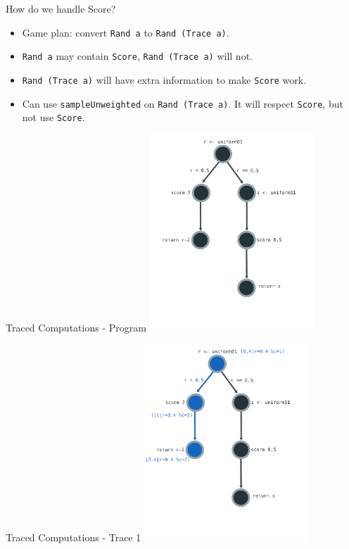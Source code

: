 \documentclass{beamer}
\newcommand{\hsmint}[1]{\texttt{#1}}
\begin{document}
\begin{frame}[fragile]{How do we handle Score?}
    \begin{itemize}
        \item Game plan: convert \hsmint{Rand a} to \hsmint{Rand (Trace a)}.
        \item \hsmint{Rand a} may contain \hsmint{Score}, \hsmint{Rand (Trace a)} will not.
        \item \hsmint{Rand (Trace a)} will have extra information to make \hsmint{Score} work.
        \item Can use \hsmint{sampleUnweighted} on \hsmint{Rand (Trace a)}. It will respect \hsmint{Score}, but not use \hsmint{Score}.
\end{itemize}
\end{frame}

\begin{frame}[fragile]{Traced Computations - Program}
\includegraphics[height=280px]{res/program-1.pdf}
\end{frame}

\begin{frame}[fragile]{Traced Computations - Trace 1}
\includegraphics[height=280px]{res/program-2.pdf}
\end{frame}
\end{document}
